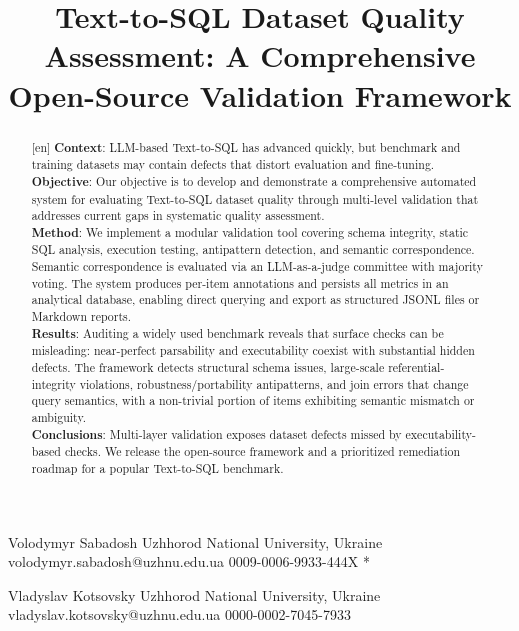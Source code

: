 \documentclass[print]{einformatica}
\begin{document}
\raggedbottom

\title{Text-to-SQL Dataset Quality Assessment: A Comprehensive Open-Source Validation Framework}



\EIauthorI
   {Volodymyr}
   {Sabadosh}
   {Uzhhorod National University, Ukraine}
   {volodymyr.sabadosh@uzhnu.edu.ua}
   {0009-0006-9933-444X}
   {*} %

\EIauthorII
   {Vladyslav}
   {Kotsovsky}
   {Uzhhorod National University, Ukraine}
   {vladyslav.kotsovsky@uzhnu.edu.ua}
   {0000-0002-7045-7933}
   {} %
 


\begin{abstract}[en]
\textbf{Context}: 
LLM-based Text-to-SQL has advanced quickly, but benchmark and training datasets may contain defects that distort evaluation and fine-tuning. \\
\textbf{Objective}: 
Our objective is to develop and demonstrate a comprehensive automated system for evaluating Text-to-SQL dataset quality through multi-level validation that addresses current gaps in systematic quality assessment. \\
\textbf{Method}: 
We implement a modular validation tool covering schema integrity, static SQL analysis, execution testing, antipattern detection, and semantic correspondence. Semantic correspondence is evaluated via an LLM-as-a-judge committee with majority voting. The system produces per-item annotations and persists all metrics in an analytical database, enabling direct querying and export as structured JSONL files or Markdown reports. \\
\textbf{Results}:
Auditing a widely used benchmark reveals that surface checks can be misleading: near-perfect parsability and executability coexist with substantial hidden defects. The framework detects structural schema issues, large-scale referential-integrity violations, robustness/portability antipatterns, and join errors that change query semantics, with a non-trivial portion of items exhibiting semantic mismatch or ambiguity. \\
\textbf{Conclusions}:
Multi-layer validation exposes dataset defects missed by executability-based checks. We release the open-source framework and a prioritized remediation roadmap for a popular Text-to-SQL benchmark.
\end{abstract}
\end{document}
